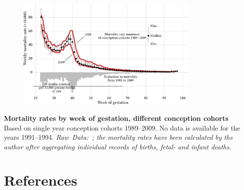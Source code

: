 \documentclass{beamer}
\begin{document}
\begin{frame}
\frametitle{\insertsection}

\begin{figure}[htb!]
\includegraphics[width = 0.8\textwidth]{./fig/us_fimort_obsmx_1989_2009.pdf}\\
\end{figure}

\footnotesize\textbf{Mortality rates by week of gestation, different conception cohorts}\\
Based on single year conception cohorts 1989--2009. No data is available for the years 1991--1994.
\scriptsize\emph{Raw~Data:~\textcite{DVS2015}; the mortality rates have been calculated by the author after aggregating individual records of births, fetal- and infant deaths.}

\end{frame}

\section{References} %

\begin{frame}
\frametitle{\insertsection}

\nocite{Hmd2015}

\printbibliography

\end{frame}
\end{document}
